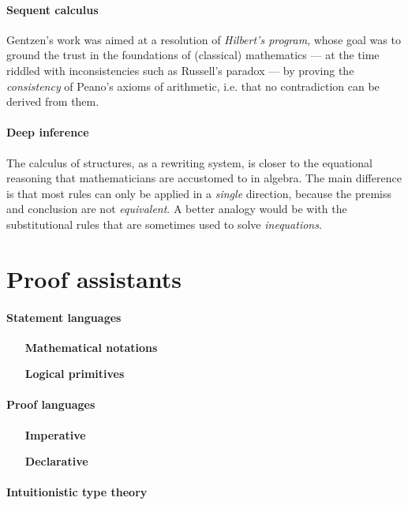 \paragraph{Sequent calculus}

Gentzen's work was aimed at a resolution of \emph{Hilbert's program}, whose goal
was to ground the trust in the foundations of (classical) mathematics --- at the
time riddled with inconsistencies such as Russell's paradox --- by proving the
\emph{consistency} of Peano's axioms of arithmetic, i.e. that no contradiction
can be derived from them.


\paragraph{Deep inference}

The calculus of structures, as a rewriting system, is closer to the equational
reasoning that mathematicians are accustomed to in algebra. The main difference
is that most rules can only be applied in a \emph{single} direction, because the
premiss and conclusion are not \emph{equivalent}. A better analogy would be with
the substitutional rules that are sometimes used to solve \emph{inequations}.

\section{Proof assistants}

\paragraph{Statement languages}

\begin{itemize}
  \item[\textbf{Mathematical notations}]
  \item[\textbf{Logical primitives}]
\end{itemize}

\paragraph{Proof languages}

\begin{itemize}
  \item[\textbf{Imperative}]
  \item[\textbf{Declarative}]
\end{itemize}

\paragraph{Intuitionistic type theory}

